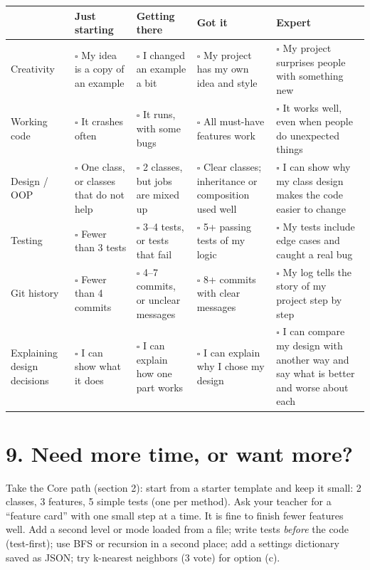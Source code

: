 \documentclass[level=3]{kidscode}
\begin{document}
\begingroup\small
\renewcommand{\arraystretch}{1.3}
\begin{longtable}{@{}>{\bfseries\raggedright\arraybackslash}p{2.2cm}>{\raggedright\arraybackslash}p{3.15cm}>{\raggedright\arraybackslash}p{3.15cm}>{\raggedright\arraybackslash}p{3.15cm}>{\raggedright\arraybackslash}p{\dimexpr\linewidth-11.65cm-8\tabcolsep}@{}}
\toprule
\rowcolor{kcaccent!15} & Just starting & Getting there & Got it & Expert\\ \midrule\endhead
\bottomrule\endfoot
Creativity & $\square$ My idea is a copy of an example & $\square$ I changed an example a bit & $\square$ My project has my own idea and style & $\square$ My project surprises people with something new\\ \midrule
Working code & $\square$ It crashes often & $\square$ It runs, with some bugs & $\square$ All must-have features work & $\square$ It works well, even when people do unexpected things\\ \midrule
Design / OOP & $\square$ One class, or classes that do not help & $\square$ 2 classes, but jobs are mixed up & $\square$ Clear classes; inheritance or composition used well & $\square$ I can show why my class design makes the code easier to change\\ \midrule
Testing & $\square$ Fewer than 3 tests & $\square$ 3--4 tests, or tests that fail & $\square$ 5+ passing tests of my logic & $\square$ My tests include edge cases and caught a real bug\\ \midrule
Git history & $\square$ Fewer than 4 commits & $\square$ 4--7 commits, or unclear messages & $\square$ 8+ commits with clear messages & $\square$ My log tells the story of my project step by step\\ \midrule
Explaining design decisions & $\square$ I can show what it does & $\square$ I can explain how one part works & $\square$ I can explain why I chose my design & $\square$ I can compare my design with another way and say what is better and worse about each\\
\end{longtable}
\endgroup

\section{9. Need more time, or want more?}
\begin{differentiation}
\supportpath Take the Core path (section 2): start from a starter template and keep it small:
2 classes, 3 features, 5 simple tests (one per method). Ask your teacher for a \enquote{feature card} with one small step at a time. It
is fine to finish fewer features well.
\extensionpath Add a second level or mode loaded from a file; write tests \emph{before} the code
(test-first); use BFS or recursion in a second place; add a settings dictionary saved as JSON; try
k-nearest neighbors (3 vote) for option (c).
\end{differentiation}
\end{document}

